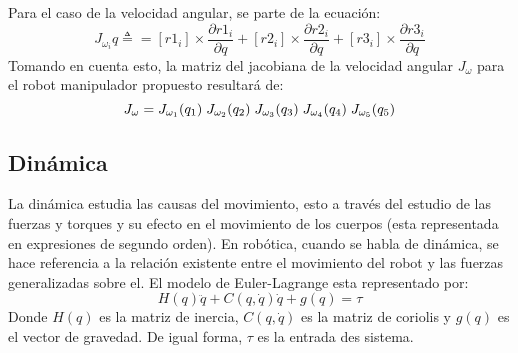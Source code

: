 \documentclass[journal]{IEEEtran}
\begin{document}
    Para el caso de la velocidad angular, se parte de la ecuación:
    \begin{equation*}
        J_{\omega _i}q \triangleq = [r1_i] \times\frac{\partial r1_i}{\partial q} + [r2_i] \times\frac{\partial r2_i}{\partial q}
                                    + [r3_i] \times\frac{\partial r3_i}{\partial q}
    \end{equation*}
    Tomando en cuenta esto, la matriz del jacobiana de la velocidad angular $J_{\omega}$ para el robot manipulador propuesto
    resultará de:
    \begin{equation*}
        J_\omega = J_{\omega_1}(q_1) \hspace{1mm} J_{\omega_2}(q_2) \hspace{1mm} J_{\omega_3}(q_3) \hspace{1mm} J_{\omega_4}(q_4) \hspace{1mm} J_{\omega_5}(q_5)
    \end{equation*}

    \subsection{Dinámica}
    La dinámica estudia las causas del movimiento, esto a través del estudio de las fuerzas y torques y su efecto en
    el movimiento de los cuerpos (esta representada en expresiones de segundo orden). En robótica, cuando se habla de
    dinámica, se hace referencia a la relación existente entre el movimiento del robot y las fuerzas generalizadas sobre el. 
    El modelo de Euler-Lagrange esta representado por: 
    \begin{equation*}
        H(q)\ddot{q} + C(q, \dot{q}) \dot{q} + g(q) = \tau
    \end{equation*}
    Donde $H(q)$ es la matriz de inercia, $C(q, \dot{q})$ es la matriz de coriolis  y $g(q)$ es el vector de gravedad.
    De igual forma, $\tau$ es la entrada des sistema.\\ 
\end{document}
